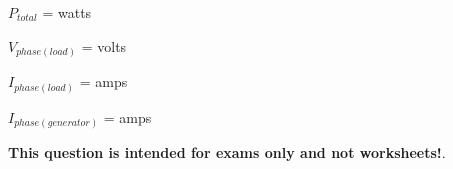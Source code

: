 \vskip 10pt

$P_{total}$ =  watts

\vskip 10pt

$V_{phase (load)}$ =  volts 

\vskip 10pt

$I_{phase (load)}$ =  amps 

\vskip 10pt

$I_{phase (generator)}$ =  amps 







{\bf This question is intended for exams only and not worksheets!}.



